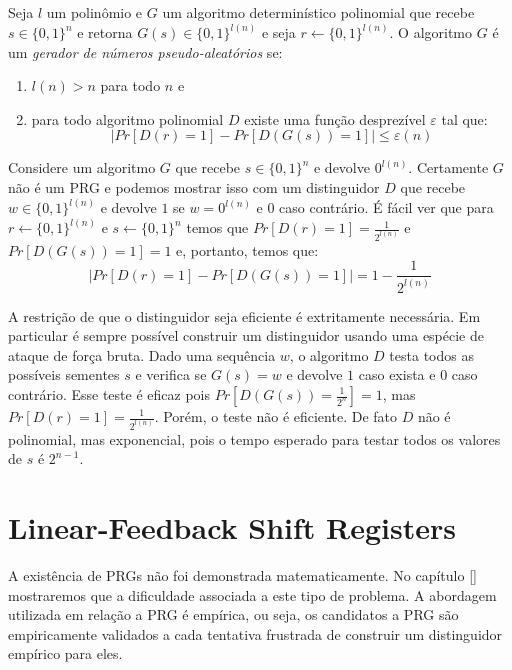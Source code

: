 \begin{definition}
  Seja $l$ um polinômio e $G$ um algoritmo determinístico polinomial que recebe $s \in \{0,1\}^n$ e retorna $G(s) \in \{0,1\}^{l(n)}$ e seja $r \leftarrow \{0,1\}^{l(n)}$.
  O algoritmo $G$ é um {\em gerador de números pseudo-aleatórios} se:
\begin{enumerate}
\item $l(n) > n$ para todo $n$ e
\item para todo algoritmo polinomial $D$ existe uma função desprezível $\varepsilon$ tal que:
\begin{displaymath}
  |Pr[D(r) = 1] - Pr[D(G(s)) = 1]| \leq \varepsilon(n)  
\end{displaymath}
\end{enumerate}
\end{definition}


\begin{example}
  Considere um algoritmo $G$ que recebe $s \in \{0,1\}^n$ e devolve $0^{l(n)}$.
  Certamente $G$ não é um PRG e podemos mostrar isso com um distinguidor $D$ que recebe $w \in \{0,1\}^{l(n)}$ e devolve $1$ se $w = 0^{l(n)}$ e $0$ caso contrário.
  É fácil ver que para $r \leftarrow \{0,1\}^{l(n)}$ e $s \leftarrow \{0,1\}^n$ temos que $Pr[D(r) = 1] = \frac{1}{2^{l(n)}}$ e $Pr[D(G(s)) = 1] = 1$ e, portanto, temos que:
\begin{displaymath}
  |Pr[D(r) = 1] - Pr[D(G(s)) = 1]| = 1 - \frac{1}{2^{l(n)}}
\end{displaymath}

\end{example}


A restrição de que o distinguidor seja eficiente é extritamente necessária.
Em particular é sempre possível construir um distinguidor usando uma espécie de ataque de força bruta.
Dado uma sequência $w$, o algoritmo $D$ testa todos as possíveis sementes $s$ e verifica se $G(s) = w$ e devolve $1$ caso exista e $0$ caso contrário.
Esse teste é eficaz pois $Pr[D(G(s)) = \frac{1}{2^n}] = 1$, mas $Pr[D(r) = 1] = \frac{1}{2^{l(n)}}$.
Porém, o teste não é eficiente.
De fato $D$ não é polinomial, mas exponencial, pois o tempo esperado para testar todos os valores de $s$ é $2^{n-1}$. 

\section{Linear-Feedback Shift Registers}
\label{sec:lfsr}

A existência de PRGs não foi demonstrada matematicamente.
No capítulo \ref{} mostraremos que a dificuldade associada a este tipo de problema.
A abordagem utilizada em relação a PRG é empírica, ou seja, os candidatos a PRG são empiricamente validados a cada tentativa frustrada de construir um distinguidor empírico para eles.


